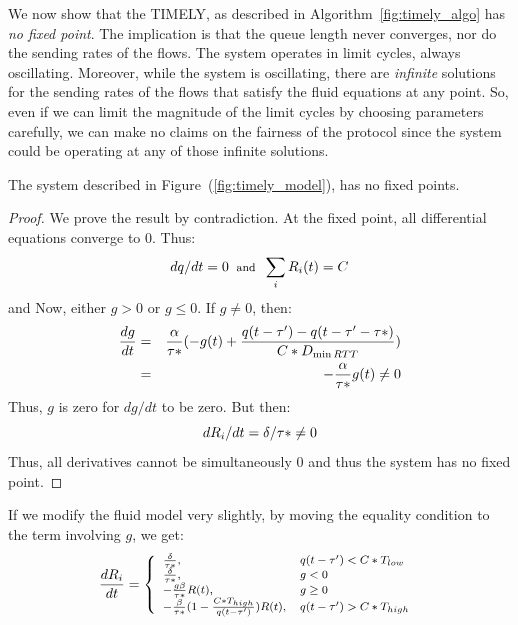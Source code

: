 We now show that the TIMELY, as described
in Algorithm~\ref{fig:timely_algo} has \emph{no fixed point}. The implication
is that the queue length never converges, nor do the sending rates of the flows.
The system operates in limit cycles, always oscillating. Moreover, while the
system is oscillating, there are \emph{infinite} solutions for the sending rates
of the flows that satisfy the fluid equations at any point. So, even if we can
limit the magnitude of the limit cycles by choosing parameters carefully, we can
make no claims on the fairness of the protocol since the system could be
operating at any of those infinite solutions.

\begin{thm} 
\label{thm:nofixed}
The system described in Figure~(\ref{fig:timely_model}), has no fixed points.
\end{thm}
\begin{proof}
We prove the result by contradiction. At the fixed point, all
differential equations converge to 0. Thus:
\begin{equation*}
\small
{dq}/{dt} = 0 \; \; \mbox{and} \; \;  \sum_{i} R_i(t) =  C
\end{equation*}  and 
Now, either $g > 0$ or $g  \le 0$. If $g \ne 0$, then:
\begin{eqnarray*}
\small
\frac{{dg}}{{dt}} & = & \frac{\alpha }{{\tau *}}( - g(t) + \frac{{q(t
                        - \tau ') - q(t - \tau ' - \tau
                        *)}}{{C*{D_{\min RTT}}}})\\
& = &  -\frac{\alpha }{{\tau *}} g(t)  \ne  0 
\end{eqnarray*}
Thus, $g$ is zero for $dg/dt$ to be zero. But then:
\begin{equation*}
\small
{dR_i}/{dt} =  {\delta }/{{\tau *}} \ne 0
\end{equation*}
Thus, all derivatives cannot be simultaneously 0 and thus the system has no fixed
point.
\end{proof}

If we modify the fluid model very slightly, by moving the equality condition to
the term involving $g$, we get:
\begin{equation}
\small
\frac{{dR_i}}{{dt}} = \left\{ \begin{array}{ll}
\frac{\delta }{{\tau *}}, & q(t - \tau ') < C*{T_{low}}\\
\frac{\delta }{{\tau *}}, & g < 0\\
 - \frac{{g\beta }}{{\tau *}}R(t), & g \ge 0\\
 - \frac{\beta }{{\tau *}}(1 - \frac{{C*{T_{high}}}}{{q(t - \tau ')}})R(t), & q(t - \tau ') > C*{T_{high}}
\end{array} \right.\\
\label{eq:timely_r_modified}
\end{equation}

